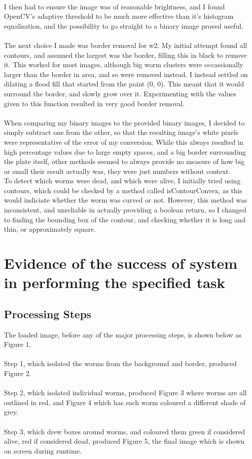 \documentclass[a4paper,12pt]{article}
\begin{document}
\\
I then had to ensure the image was of reasonable brightness, and I found OpenCV's adaptive threshold to be much more effective than it's histogram equalisation, and the possibility to go straight to a binary image proved useful.
\\\\
The next choice I made was border removal for w2. My initial attempt found all contours, and assumed the largest was the border, filling this in black to remove it. This worked for most images, although big worm clusters were occassionally larger than the border in area, and so were removed instead. I instead settled on dilating a flood fill that started from the point (0, 0). This meant that it would surround the border, and slowly grow over it. Experimenting with the values given to this function resulted in very good border removal.
\\\\
When comparing my binary images to the provided binary images, I decided to simply subtract one from the other, so that the resulting image's white pixels were representative of the error of my conversion. While this always resulted in high percentage values due to large empty spaces, and a big border surrounding the plate itself, other methods seemed to always provide no measure of how big or small their result actually was, they were just numbers without context.
\\
To detect which worms were dead, and which were alive, I initially tried using contours, which could be checked by a method called isContourConvex, as this would indiciate whether the worm was curved or not. However, this method was inconsistent, and unreliable in actually providing a boolean return, so I changed to finding the bounding box of the contour, and checking whether it is long and thin, or approximately square.

\section*{Evidence of the success of system in performing the specified task}
\subsection*{Processing Steps}
The loaded image, before any of the major processing steps, is shown below as Figure 1.
\\\\
Step 1, which isolated the worms from the background and border, produced Figure 2.
\\\\
Step 2, which isolated individual worms, produced Figure 3 where worms are all outlined in red, and Figure 4 which has each worm coloured a different shade of grey.
\\\\
Step 3, which drew boxes around worms, and coloured them green if considered alive, red if considered dead, produced Figure 5, the final image which is shown on screen during runtime.
\end{document}
